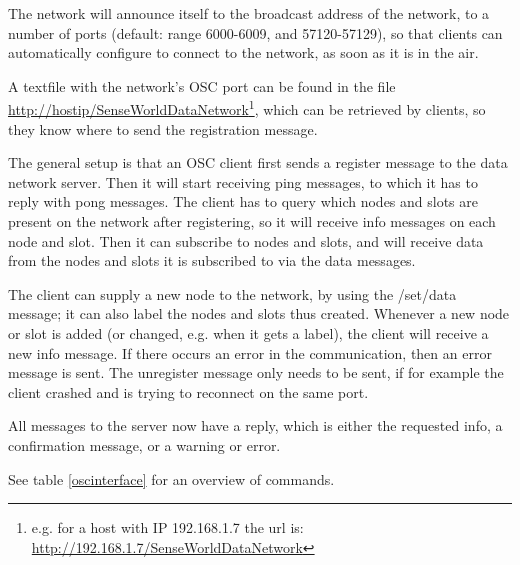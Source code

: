 \documentclass[letterpaper,10pt]{article}
\begin{document}
The network will announce itself to the broadcast address of the network, to a number of ports (default: range 6000-6009, and 57120-57129), so that clients can automatically configure to connect to the network, as soon as it is in the air.

A textfile with the network's OSC port can be found in the file \url{http://hostip/SenseWorldDataNetwork}\footnote{e.g. for a host with IP 192.168.1.7 the url is: \url{http://192.168.1.7/SenseWorldDataNetwork}}, which can be retrieved by clients, so they know where to send the registration message.

The general setup is that an OSC client first sends a register message to the data network server. Then it will start receiving ping messages, to which it has to reply with pong messages. The client has to query which nodes and slots are present on the network after registering, so it will receive info messages on each node and slot. Then it can subscribe to nodes and slots, and will receive data from the nodes and slots it is subscribed to via the data messages.

The client can supply a new node to the network, by using the /set/data message; it can also label the nodes and slots thus created.
Whenever a new node or slot is added (or changed, e.g. when it gets a label), the client will receive a new info message.
If there occurs an error in the communication, then an error message is sent. The unregister message only needs to be sent, if for example the client crashed and is trying to reconnect on the same port.

All messages to the server now have a reply, which is either the requested info, a confirmation message, or a warning or error.

See table \ref{oscinterface} for an overview of commands.
\end{document}
